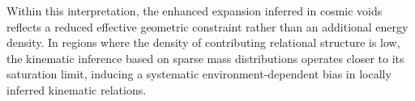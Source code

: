   Within this interpretation, the enhanced expansion inferred in cosmic voids
  reflects a reduced effective geometric constraint rather than an additional
  energy density.
  In regions where the density of contributing relational structure is low,
  the kinematic inference based on sparse mass distributions operates closer
  to its saturation limit, inducing a systematic environment-dependent bias
  in locally inferred kinematic relations.
